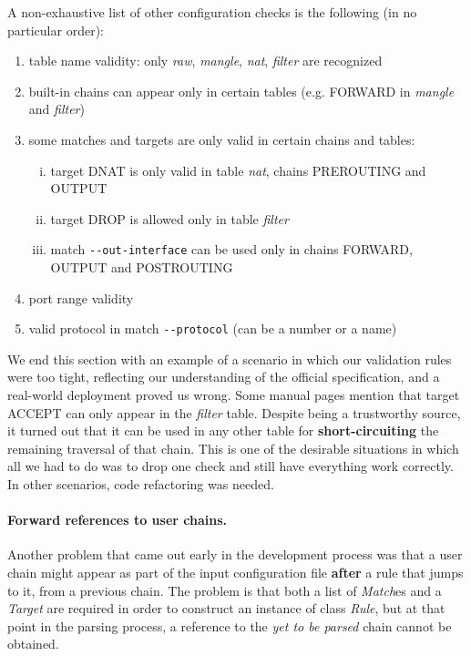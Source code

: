 A non-exhaustive list of other configuration checks is the following (in no
particular order):
\begin{enumerate}
  \item table name validity: only \emph{raw}, \emph{mangle}, \emph{nat},
    \emph{filter} are recognized
  \item built-in chains can appear only in certain tables (e.g. FORWARD in
    \emph{mangle} and \emph{filter})
  \item some matches and targets are only valid in certain chains and tables:
    \begin{enumerate}[(i)]
      \item target DNAT is only valid in table \emph{nat}, chains PREROUTING
        and OUTPUT
      \item target DROP is allowed only in table \emph{filter}
      \item match \lstinline{--out-interface} can be used only in chains
        FORWARD, OUTPUT and POSTROUTING
    \end{enumerate}
  \item port range validity
  \item valid protocol in match \lstinline{--protocol} (can be a number or a
    name)
\end{enumerate}

We end this section with an example of a scenario in which our validation rules
were too tight, reflecting our understanding of the official specification, and
a real-world deployment proved us wrong.  Some manual pages mention that target
ACCEPT can only appear in the \emph{filter} table.  Despite being a trustworthy
source, it turned out that it can be used in any other table for
\textbf{short-circuiting} the remaining traversal of that chain.  This is one
of the desirable situations in which all we had to do was to drop one check and
still have everything work correctly.  In other scenarios, code refactoring was
needed.

\paragraph{Forward references to user chains.}
Another problem that came out early in the development process was that a user
chain might appear as part of the input configuration file \textbf{after} a
rule that jumps to it, from a previous chain.  The problem is that both a list
of \emph{Match}es and a \emph{Target} are required in order to construct an
instance of class \emph{Rule}, but at that point in the parsing process, a
reference to the \emph{yet to be parsed} chain cannot be obtained.

